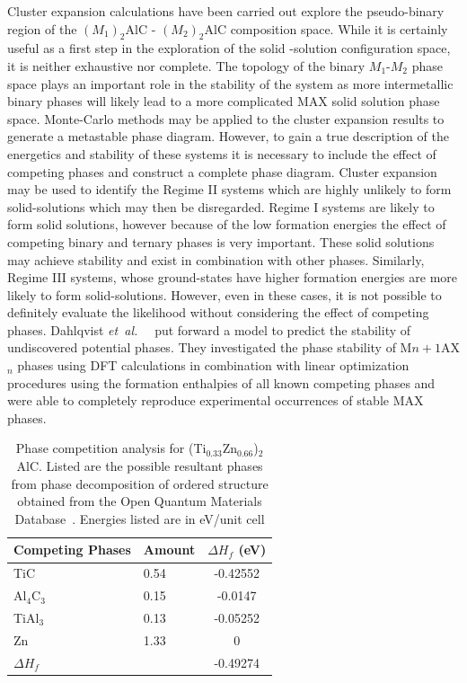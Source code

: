 \documentclass[preprint,amsmath,amssymb,aps, prb,showkeys]{revtex4-1}
\def\etal{\mbox{\it et al.\ }}
\begin{document}
Cluster expansion calculations have been carried out explore the pseudo-binary region of the $(M_1)_2$AlC - $(M_2)_2$AlC composition space. While it is certainly useful as a first step in the exploration of the solid -solution configuration space, it is neither exhaustive nor complete. The topology of the binary $M_1$-$M_2$ phase space plays an important role in the stability of the system as more intermetallic binary phases will likely lead to a more complicated MAX solid solution phase space. Monte-Carlo methods may be applied to the cluster expansion results to generate a metastable phase diagram. However, to gain a true description of the energetics and stability of these systems it is necessary to include the effect of competing phases and construct a complete phase diagram. Cluster expansion may be used to identify the Regime II systems which are highly unlikely to form solid-solutions which may then be disregarded. Regime I systems are likely to form solid solutions, however because of the low formation energies the 
effect of competing binary and ternary phases is very important. These solid solutions may achieve stability and exist in combination with other phases. Similarly, Regime III systems, whose ground-states have higher formation energies are more likely to form solid-solutions. However, even in these cases, it is not possible to definitely evaluate the likelihood without considering the effect of competing phases. Dahlqvist \etal~\cite{dahlqvist2010stability}  put forward a model to predict the stability of undiscovered potential phases. They investigated the phase stability of M$n+1$AX$_n$ phases using DFT calculations in combination with
linear optimization procedures using the formation enthalpies of all known competing phases and were able to  completely reproduce experimental occurrences of stable MAX phases. 

\begin{table}[tbp!]
\centering
\setlength{\tabcolsep}{0.2cm}
\setlength\extrarowheight{2.5pt}
\begin{tabular}{llc}
\hline \hline
Competing  Phases                   & Amount                 & $\Delta H_f$ (eV) \\
\hline 
TiC                    & 0.54                   & -0.42552                  \\
Al$_4$C$_3$                  & 0.15                   & -0.0147                   \\
TiAl$_3$                  & 0.13                   & -0.05252                  \\
Zn                     & 1.33                   & 0                         \\
\hline
\multicolumn{2}{l}{$\Delta H_f$} & -0.49274        \\
\hline \hline
\end{tabular}
\caption{Phase competition analysis for (Ti$_{0.33}$Zn$_0.66$)$_2$AlC. Listed are the possible resultant phases from phase decomposition of ordered structure obtained from the Open Quantum Materials Database~\cite{saal2013materials}. Energies listed are in eV/unit cell}
\label{tab:OQMD_TiZn}
\end{table}
\end{document}
